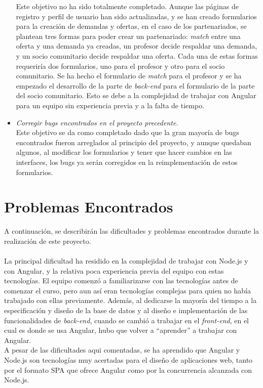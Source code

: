 \documentclass[11pt]{book}
\begin{document}
\begin{itemize}
	Este objetivo no ha sido totalmente completado. Aunque las páginas de registro y perfil de usuario han sido actualizadas, y se han creado formularios para la creación de demandas y ofertas, en el caso de los partenariados, se plantean tres formas para poder crear un partenariado: \emph{match} entre una oferta y una demanda ya creadas, un profesor decide respaldar una demanda, y un socio comunitario decide respaldar una oferta. Cada una de estas formas requeriría dos formularios, uno para el profesor y otro para el socio comunitario. Se ha hecho el formulario de \emph{match} para el profesor y se ha empezado el desarrollo de la parte de \emph{back-end} para el formulario de la parte del socio comunitario. Esto se debe a la complejidad de trabajar con Angular para un equipo sin experiencia previa y a la falta de tiempo.
	\item \emph{Corregir bugs encontrados en el proyecto precedente.}\\
	Este objetivo se da como completado dado que la gran mayoría de bugs encontrados fueron arreglados al principio del proyecto, y aunque quedaban algunos, al modificar los formularios y tener que hacer cambios en las interfaces, los bugs ya serán corregidos en la reimplementación de estos formularios.

\end{itemize}

\section{Problemas Encontrados}
A continuación, se describirán las dificultades y problemas encontrados durante la realización de este proyecto. \\\\
La principal dificultad ha residido en la complejidad de trabajar con Node.js y con Angular, y la relativa poca experiencia previa del equipo con estas tecnologías. El equipo comenzó a familiarizarse con las tecnologías antes de comenzar el curso, pero aun así eran tecnologías complejas para quien no había trabajado con ellas previamente. Además, al dedicarse la mayoría del tiempo a la especificación y diseño de la base de datos y al diseño e implementación de las funcionalidades de \emph{back-end}, cuando se cambió a trabajar en el \emph{front-end}, en el cual es donde se usa Angular, hubo que volver a ``aprender'' a trabajar con Angular.\\
A pesar de las dificultades aqui comentadas, se ha aprendido que Angular y Node.js son tecnologías muy acertadas para el diseño de aplicaciones web, tanto por el formato SPA que ofrece Angular como por la concurrencia alcanzada con Node.js.
\end{document}
